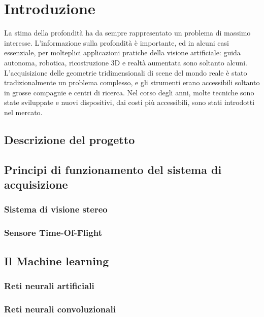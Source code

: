 \chapter{Introduzione}  
La stima della profondità ha da sempre rappresentato un problema di massimo interesse. L'informazione sulla profondità è importante, ed in alcuni casi essenziale, per molteplici applicazioni pratiche della visione artificiale: guida autonoma, robotica, ricostruzione 3D e realtà aumentata sono soltanto alcuni. 
L'acquisizione delle geometrie tridimensionali di scene del mondo reale è stato tradizionalmente un problema complesso, e gli strumenti erano accessibili soltanto in grosse compagnie e centri di ricerca. Nel corso degli anni, molte tecniche sono state sviluppate e nuovi dispositivi, dai costi più accessibili, sono stati introdotti nel mercato.


\section{Descrizione del progetto}

\section{Principi di funzionamento del sistema di acquisizione}

\subsection{Sistema di visione stereo}

\subsection{Sensore Time-Of-Flight}

\section{Il Machine learning}

\subsection{Reti neurali artificiali}

\subsection{Reti neurali convoluzionali}